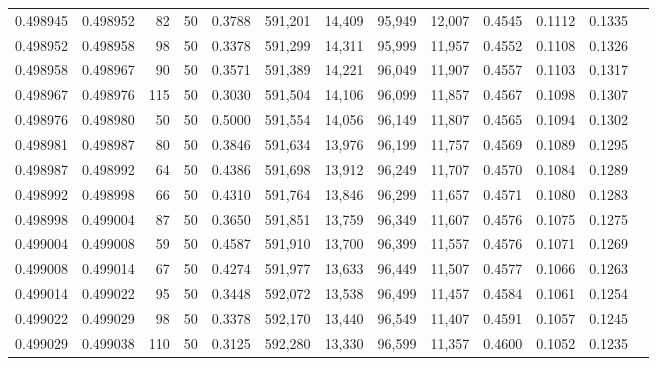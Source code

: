\begin{tabular}{rrrrrrrrrrrrr}
0.498945 & 0.498952 &    82 &  50 &                                     0.3788 & 591,201 &  14,409 &  95,949 &  12,007 & 0.4545 & 0.1112 & 0.1335 \\
0.498952 & 0.498958 &    98 &  50 &                                     0.3378 & 591,299 &  14,311 &  95,999 &  11,957 & 0.4552 & 0.1108 & 0.1326 \\
0.498958 & 0.498967 &    90 &  50 &                                     0.3571 & 591,389 &  14,221 &  96,049 &  11,907 & 0.4557 & 0.1103 & 0.1317 \\
0.498967 & 0.498976 &   115 &  50 &                                     0.3030 & 591,504 &  14,106 &  96,099 &  11,857 & 0.4567 & 0.1098 & 0.1307 \\
0.498976 & 0.498980 &    50 &  50 &                                     0.5000 & 591,554 &  14,056 &  96,149 &  11,807 & 0.4565 & 0.1094 & 0.1302 \\
0.498981 & 0.498987 &    80 &  50 &                                     0.3846 & 591,634 &  13,976 &  96,199 &  11,757 & 0.4569 & 0.1089 & 0.1295 \\
0.498987 & 0.498992 &    64 &  50 &                                     0.4386 & 591,698 &  13,912 &  96,249 &  11,707 & 0.4570 & 0.1084 & 0.1289 \\
0.498992 & 0.498998 &    66 &  50 &                                     0.4310 & 591,764 &  13,846 &  96,299 &  11,657 & 0.4571 & 0.1080 & 0.1283 \\
0.498998 & 0.499004 &    87 &  50 &                                     0.3650 & 591,851 &  13,759 &  96,349 &  11,607 & 0.4576 & 0.1075 & 0.1275 \\
0.499004 & 0.499008 &    59 &  50 &                                     0.4587 & 591,910 &  13,700 &  96,399 &  11,557 & 0.4576 & 0.1071 & 0.1269 \\
0.499008 & 0.499014 &    67 &  50 &                                     0.4274 & 591,977 &  13,633 &  96,449 &  11,507 & 0.4577 & 0.1066 & 0.1263 \\
0.499014 & 0.499022 &    95 &  50 &                                     0.3448 & 592,072 &  13,538 &  96,499 &  11,457 & 0.4584 & 0.1061 & 0.1254 \\
0.499022 & 0.499029 &    98 &  50 &                                     0.3378 & 592,170 &  13,440 &  96,549 &  11,407 & 0.4591 & 0.1057 & 0.1245 \\
0.499029 & 0.499038 &   110 &  50 &                                     0.3125 & 592,280 &  13,330 &  96,599 &  11,357 & 0.4600 & 0.1052 & 0.1235 \\

\end{tabular}
